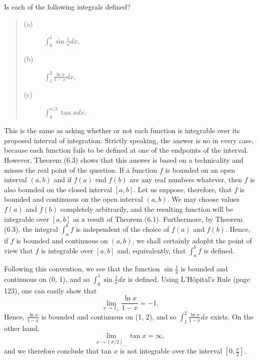 \begin{example} Is each of the following integrals defined?
 
\begin{quote}
\begin{description}
\item[(a)] $\int_0^1 \sin \frac{1}{x} dx,$ 
\item[(b)] $\int_1^2 \frac{\ln x}{1 - x} dx,$ 
\item[(c)] $\int_0^{\pi/2} \tan x dx.$
\end{description}
\end{quote}
 
\noindent This is the same as asking whether or not each function is integrable over its proposed interval of integration. Strictly speaking, the answer is no in every case, because each function fails to be defined at one of the endpoints of the interval. However, Theorem (6.3) shows that this answer is based on a technicality and misses the real point of the question. If a function $f$ is bounded on an open interval $(a, b)$ and if $f(a)$ end $f(b)$ are any real numbers whatever, then $f$ is also bounded on the closed interval $[a, b]$. Let us suppose, therefore, that $f$ is bounded and continuous on the open interval $(a, b)$. We may choose values $f(a)$ and $f(b)$ completely arbitrarily, and the resulting function will be integrable over $[a, b]$ as a result of Theorem (6.1). Furthermore, by Theorem (6.3), the integral $\int_a^b f$ is independent of the choice of $f(a)$ and $f(b)$. Hence, if $f$ is bounded and continuous on $(a, b)$, we shall
certainly adopbt the point of view that $f$ is integrable over $[a, b]$ and, equivalently, that $\int_a^b f$ is defined.
\end{example}

Following this convention, we see that the function $\sin \frac{1}{x}$ is bounded and continuous on (0, 1), and so $\int_0^1 \sin \frac{1}{x} dx$ is defined. Using L'H\^{o}pital's Rule (page 123), one can easily show that  
$$
\lim_{x \rightarrow 1_{+}} \frac{\ln x}{1 - x} = - 1 .
$$
\noindent Hence, $\frac{\ln x}{1 - x}$ is bounded and continuous on (1, 2), and so $\int_1^2  \frac{\ln x}{1 - x} dx$ exists. On the other hand, 
$$
\lim_{x \rightarrow (\pi/2)_{-}} \tan x = \infty,
$$
\noindent and we therefore conclude that tan $x$ is not integrable over the interval $[0, \frac{\pi}{2}]$.

\vspace{.2in}

